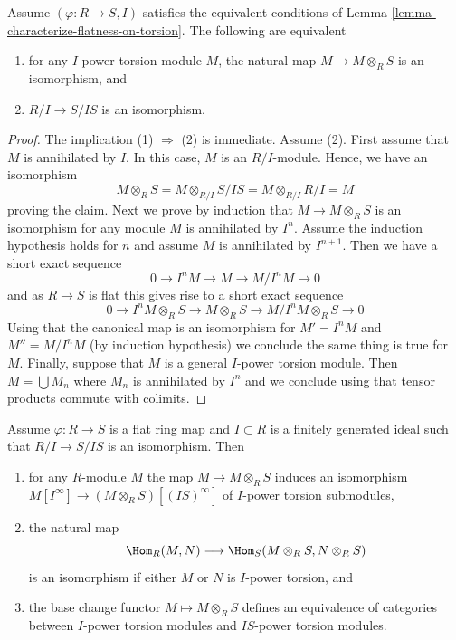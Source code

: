 \begin{lemma}
\label{lemma-neighbourhood-isomorphism}
Assume $(\varphi : R \to S, I)$ satisfies the equivalent conditions of
Lemma \ref{lemma-characterize-flatness-on-torsion}.
The following are equivalent
\begin{enumerate}
\item for any $I$-power torsion module $M$, the natural map
$M \to M \otimes_R S$ is an isomorphism, and
\item $R/I \to S/IS$ is an isomorphism.
\end{enumerate}
\end{lemma}

\begin{proof}
The implication (1) $\Rightarrow$ (2) is immediate.
Assume (2). First assume that $M$ is annihilated by $I$.
In this case, $M$ is an $R/I$-module. Hence, we have an isomorphism
$$
M \otimes_R S = M \otimes_{R/I} S/IS = M \otimes_{R/I} R/I = M
$$
proving the claim. Next we prove by induction that $M \to M \otimes_R S$
is an isomorphism for any module $M$ is annihilated by $I^n$. Assume
the induction hypothesis holds for $n$ and assume $M$ is annihilated by
$I^{n + 1}$. Then we have a short exact sequence
$$
0 \to I^nM \to M \to M/I^nM \to 0
$$
and as $R \to S$ is flat this gives rise to a short exact sequence
$$
0 \to I^nM \otimes_R S \to M \otimes_R S \to M/I^nM \otimes_R S \to 0
$$
Using that the canonical map is an isomorphism for $M' = I^nM$ and
$M'' = M/I^nM$ (by induction hypothesis) we conclude the same thing is
true for $M$. Finally, suppose that $M$ is a general $I$-power torsion
module. Then $M = \bigcup M_n$ where $M_n$ is annihilated by $I^n$
and we conclude using that tensor products commute with colimits.
\end{proof}

\begin{lemma}
\label{lemma-neighbourhood-equivalence}
Assume $\varphi : R \to S$ is a flat ring map and $I \subset R$ is a
finitely generated ideal such that $R/I \to S/IS$ is an isomorphism. Then
\begin{enumerate}
\item for any $R$-module $M$ the map $M \to M \otimes_R S$ induces
an isomorphism
$M[I^\infty] \to (M \otimes_R S)[(IS)^\infty]$ of $I$-power
torsion submodules,
\item the natural map
$$
\Hom_R(M, N) \longrightarrow \Hom_S(M \otimes_R S, N \otimes_R S)
$$
is an isomorphism if either $M$ or $N$ is $I$-power torsion, and
\item the base change functor $M \mapsto M \otimes_R S$ defines an
equivalence of categories between $I$-power torsion modules
and $IS$-power torsion modules.
\end{enumerate}
\end{lemma}

